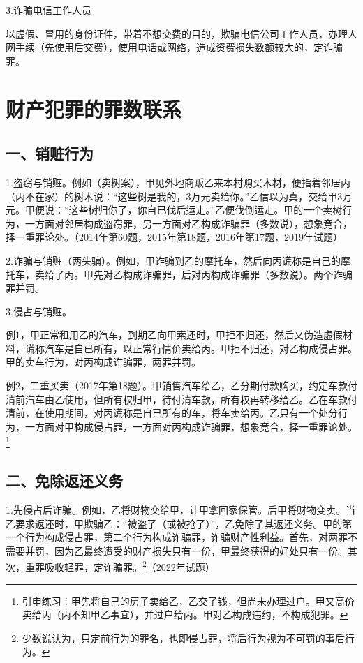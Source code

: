 3.诈骗电信工作人员

以虚假、冒用的身份证件，带着不想交费的目的，欺骗电信公司工作人员，办理人网手续（先使用后交费），使用电话或网络，造成资费损失数额较大的，定诈骗罪。

\section{财产犯罪的罪数联系}

\subsection*{一、销赃行为}

1.盗窃与销赃。例如（卖树案），甲见外地商贩乙来本村购买木材，便指着邻居丙（丙不在家）的树木说：“这些树是我的，3万元卖给你。”乙信以为真，交给甲3万元。甲便说：“这些树归你了，你自已伐后运走。”乙便伐倒运走。甲的一个卖树行为，一方面对邻居构成盗窃罪，另一方面对乙构成诈骗罪（多数说），想象竞合，择一重罪论处。（2014年第60题，2015年第18题，2016年第17题，2019年试题）

2.诈骗与销赃（两头骗）。例如，甲诈骗到乙的摩托车，然后向丙谎称是自己的摩托车，卖给了丙。甲先对乙构成诈骗罪，后对丙构成诈骗罪（多数说）。两个诈骗罪并罚。

3.侵占与销赃。

例1，甲正常租用乙的汽车，到期乙向甲索还时，甲拒不归还，然后又伪造虚假材料，谎称汽车是自已所有，以正常行情价卖给丙。甲拒不归还，对乙构成侵占罪。甲的卖车行为，对丙构成诈骗罪，两罪并罚。

例2，二重买卖（2017年第18题）。甲销售汽车给乙，乙分期付款购买，约定车款付清前汽车由乙使用，但所有权归甲，待付清车款，所有权再转移给乙。乙在车款付清前，在使用期间，对丙谎称是自已所有的车，将车卖给丙。乙只有一个处分行为，一方面对甲构成侵占罪，一方面对丙构成诈骗罪，想象竞合，择一重罪论处。\footnote{引申练习：甲先将自己的房子卖给乙，乙交了钱，但尚未办理过户。甲又高价卖给丙（丙不知甲乙事宜），并过户给丙。甲对乙构成违约，不构成犯罪。}

\subsection*{二、免除返还义务}

1.先侵占后诈骗。例如，乙将财物交给甲，让甲拿回家保管。后甲将财物变卖。当乙要求返还时，甲欺骗乙：“被盗了（或被抢了）”，乙免除了其返还义务。甲的第一个行为构成侵占罪，第二个行为构成诈骗罪，诈骗财产性利益。首先，对两罪不需要并罚，因为乙最终遭受的财产损失只有一份，甲最终获得的好处只有一份。其次，重罪吸收轻罪，定诈骗罪。\footnote{少数说认为，只定前行为的罪名，也即侵占罪，将后行为视为不可罚的事后行为。}（2022年试题）

